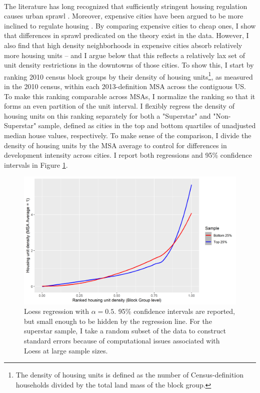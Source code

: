 \documentclass[]{article}
\begin{document}
\paragraph*{}
The literature has long recognized that sufficiently stringent housing regulation causes urban sprawl \citep{mills2005} \citep{bbheight}. Moreover, expensive cities have been argued to be more inclined to regulate housing \citep{HILBER2013} \citep{parkho}. By comparing expensive cities to cheap ones, I show that differences in sprawl predicated on the theory exist in the data. However, I also find that high density neighborhoods in expensive cities absorb relatively more housing units -- and I argue below that this reflects a relatively lax set of unit density restrictions in the downtowns of those cities. To show this, I start by ranking 2010 census block groups by their density of housing units\footnote{The density of housing units is defined as the number of Census-definition households divided by the total land mass of the block group.}, as measured in the 2010 census, within each 2013-definition MSA across the contiguous US. To make this ranking comparable across MSAs, I normalize the ranking so that it forms an even partition of the unit interval. I flexibly regress the density of housing units on this ranking separately for both a "Superstar" and "Non-Superstar" sample, defined as cities in the top and bottom quartiles of unadjusted median house values, respectively. To make sense of the comparison, I divide the density of housing units by the MSA average to control for differences in development intensity across cities. I report both regressions and 95\% confidence intervals in Figure \ref{Blockdens_dist}.
\begin{figure}[!ht]
\begin{center}
	\includegraphics[width=1.1\textwidth]{blockdens_dist.png}
	\caption{Loess regression with $\alpha = 0.5$. 95\% confidence intervals are reported, but small enough to be hidden by the regression line. For the superstar sample, I take a random subset of the data to construct standard errors because of computational issues associated with Loess at large sample sizes.}\label{Blockdens_dist}
\end{center}
\end{figure}
\end{document}
